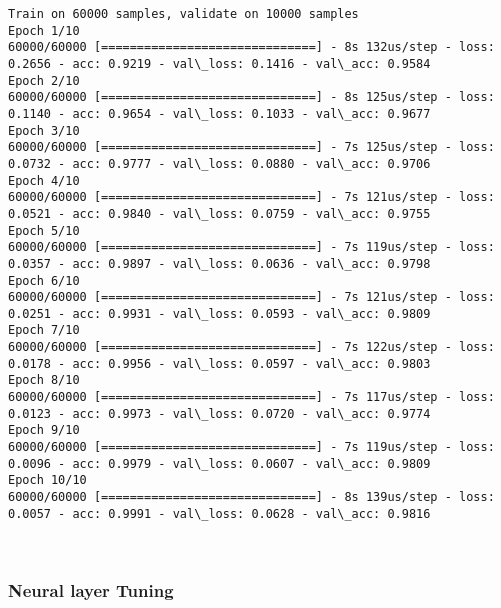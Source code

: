 \documentclass[11pt]{article}
\begin{document}
    \begin{Verbatim}[commandchars=\\\{\}]
Train on 60000 samples, validate on 10000 samples
Epoch 1/10
60000/60000 [==============================] - 8s 132us/step - loss: 0.2656 - acc: 0.9219 - val\_loss: 0.1416 - val\_acc: 0.9584
Epoch 2/10
60000/60000 [==============================] - 8s 125us/step - loss: 0.1140 - acc: 0.9654 - val\_loss: 0.1033 - val\_acc: 0.9677
Epoch 3/10
60000/60000 [==============================] - 7s 125us/step - loss: 0.0732 - acc: 0.9777 - val\_loss: 0.0880 - val\_acc: 0.9706
Epoch 4/10
60000/60000 [==============================] - 7s 121us/step - loss: 0.0521 - acc: 0.9840 - val\_loss: 0.0759 - val\_acc: 0.9755
Epoch 5/10
60000/60000 [==============================] - 7s 119us/step - loss: 0.0357 - acc: 0.9897 - val\_loss: 0.0636 - val\_acc: 0.9798
Epoch 6/10
60000/60000 [==============================] - 7s 121us/step - loss: 0.0251 - acc: 0.9931 - val\_loss: 0.0593 - val\_acc: 0.9809
Epoch 7/10
60000/60000 [==============================] - 7s 122us/step - loss: 0.0178 - acc: 0.9956 - val\_loss: 0.0597 - val\_acc: 0.9803
Epoch 8/10
60000/60000 [==============================] - 7s 117us/step - loss: 0.0123 - acc: 0.9973 - val\_loss: 0.0720 - val\_acc: 0.9774
Epoch 9/10
60000/60000 [==============================] - 7s 119us/step - loss: 0.0096 - acc: 0.9979 - val\_loss: 0.0607 - val\_acc: 0.9809
Epoch 10/10
60000/60000 [==============================] - 8s 139us/step - loss: 0.0057 - acc: 0.9991 - val\_loss: 0.0628 - val\_acc: 0.9816

    \end{Verbatim}

    \begin{center}
    \end{center}
    { \hspace*{\fill} \\}
    
    \subsubsection{Neural layer Tuning}\label{neural-layer-tuning}
\end{document}
